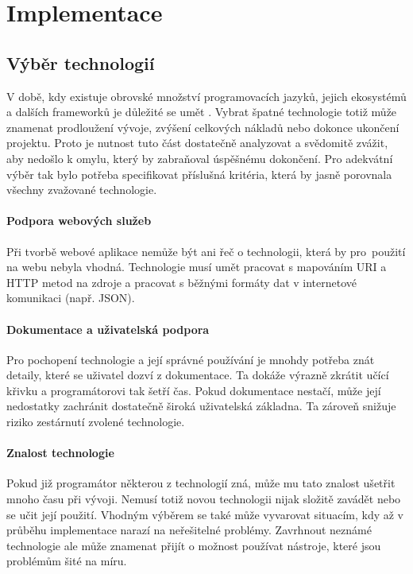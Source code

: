 \chapter{Implementace}

\section{Výběr technologií}

V době, kdy existuje obrovské množství programovacích jazyků, jejich ekosystémů a dalších frameworků je důležité se umět . 
Vybrat špatné technologie totiž může znamenat prodloužení vývoje, zvýšení celkových nákladů nebo dokonce ukončení projektu.
Proto je nutnost tuto část dostatečně analyzovat a svědomitě zvážit, aby nedošlo k omylu, který by zabraňoval úspěšnému dokončení.
Pro adekvátní výběr tak bylo potřeba specifikovat příslušná kritéria, která by jasně porovnala všechny zvažované technologie.

\subsubsection*{Podpora webových služeb}
Při tvorbě webové aplikace nemůže být ani řeč o technologii, která by pro~použití na webu nebyla vhodná. Technologie musí
umět pracovat s mapováním URI a HTTP metod na zdroje a pracovat s běžnými formáty dat v internetové komunikaci (např. JSON).

\subsubsection*{Dokumentace a uživatelská podpora}
Pro pochopení technologie a její správné používání je mnohdy potřeba znát detaily, které se uživatel dozví z dokumentace.
Ta dokáže výrazně zkrátit učící křivku a programátorovi tak šetří čas. Pokud dokumentace nestačí, může její
nedostatky zachránit dostatečně široká uživatelská základna. Ta zároveň snižuje riziko zestárnutí zvolené technologie.

\subsubsection*{Znalost technologie}
Pokud již programátor některou z technologií zná, může mu tato znalost ušetřit mnoho času při vývoji. Nemusí totiž novou technologii
nijak složitě zavádět nebo se učit její použití. Vhodným výběrem se také může vyvarovat situacím, kdy až v průběhu implementace narazí
na neřešitelné problémy. Zavrhnout neznámé technologie ale může znamenat přijít o možnost používat nástroje, které jsou problémům šité na míru. 

